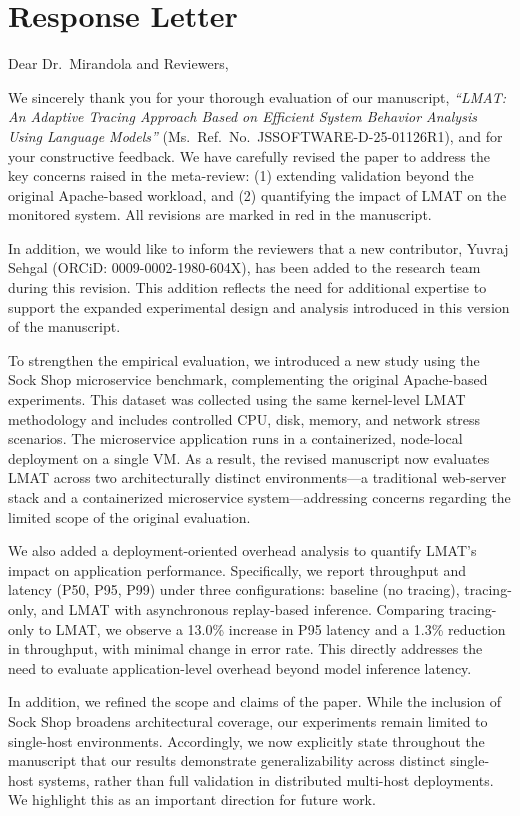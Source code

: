 \documentclass[11pt]{article}
\begin{document}
\section*{Response Letter}

Dear Dr.\ Mirandola and Reviewers,

We sincerely thank you for your thorough evaluation of our manuscript, \emph{``LMAT: An Adaptive Tracing Approach Based on Efficient System Behavior Analysis Using Language Models''} (Ms.\ Ref.\ No.\ JSSOFTWARE-D-25-01126R1), and for your constructive feedback. We have carefully revised the paper to address the key concerns raised in the meta-review: (1) extending validation beyond the original Apache-based workload, and (2) quantifying the impact of LMAT on the monitored system. All revisions are marked in red in the manuscript.

In addition, we would like to inform the reviewers that a new contributor, Yuvraj Sehgal (ORCiD: 0009-0002-1980-604X), has been added to the research team during this revision. This addition reflects the need for additional expertise to support the expanded experimental design and analysis introduced in this version of the manuscript.

To strengthen the empirical evaluation, we introduced a new study using the Sock Shop microservice benchmark, complementing the original Apache-based experiments. This dataset was collected using the same kernel-level LMAT methodology and includes controlled CPU, disk, memory, and network stress scenarios. The microservice application runs in a containerized, node-local deployment on a single VM. As a result, the revised manuscript now evaluates LMAT across two architecturally distinct environments---a traditional web-server stack and a containerized microservice system---addressing concerns regarding the limited scope of the original evaluation.

We also added a deployment-oriented overhead analysis to quantify LMAT's impact on application performance. Specifically, we report throughput and latency (P50, P95, P99) under three configurations: baseline (no tracing), tracing-only, and LMAT with asynchronous replay-based inference. Comparing tracing-only to LMAT, we observe a 13.0\% increase in P95 latency and a 1.3\% reduction in throughput, with minimal change in error rate. This directly addresses the need to evaluate application-level overhead beyond model inference latency.

In addition, we refined the scope and claims of the paper. While the inclusion of Sock Shop broadens architectural coverage, our experiments remain limited to single-host environments. Accordingly, we now explicitly state throughout the manuscript that our results demonstrate generalizability across distinct single-host systems, rather than full validation in distributed multi-host deployments. We highlight this as an important direction for future work.
\end{document}
